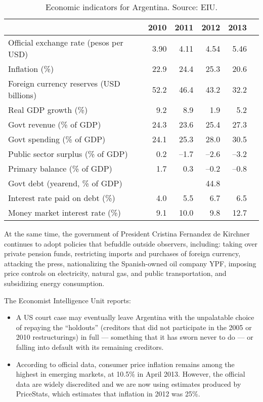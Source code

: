 \begin{enumerate}
\begin{table}[ht]
\centering
\tabcolsep=0.06in
\begin{tabular}{lrrrrr}
\toprule
                & 2010 & 2011 & 2012 & 2013 \\
\midrule
Official exchange rate (pesos per USD)  & 3.90 & 4.11 & 4.54 & 5.46  \\
Inflation (\%)              & 22.9 & 24.4 & 25.3 & 20.6 \\
Foreign currency reserves (USD billions) & 52.2 & 46.4 & 43.2 & 32.2 \\
Real GDP growth (\%)        & 9.2 & 8.9 & 1.9 & 5.2  \\
Govt revenue (\% of GDP)    & 24.3 & 23.6 & 25.4 & 27.3 \\
Govt spending (\% of GDP)   & 24.1 & 25.3 & 28.0 & 30.5  \\
Public sector surplus (\% of GDP) & 0.2 & --1.7 & --2.6 & --3.2 \\
Primary balance (\% of GDP) &  1.7 & 0.3 & --0.2 & --0.8   \\
Govt debt (yearend, \% of GDP)  & & & 44.8\\
Interest rate paid on debt (\%) & 4.0 & 5.5 & 6.7 & 6.5  \\
Money market interest rate (\%) & 9.1 & 10.0 & 9.8 & 12.7 \\
\bottomrule
\end{tabular}
\caption{Economic indicators for Argentina.  Source:  EIU.}
\label{tab:argentina}
\end{table}


At the same time, the government of President Cristina Fernandez de Kirchner
continues to adopt policies that befuddle outside observers, including:
taking over private pension funds,
restricting imports and purchases of foreign currency,
attacking the press,
nationalizing the Spanish-owned oil company YPF,
imposing price controls on electricity, natural gas, and public transportation,
and subsidizing energy consumption.

The Economist Intelligence Unit reports:
\begin{itemize}
\item A US court case may eventually leave
Argentina with the unpalatable choice of repaying the ``holdouts'' (creditors that
did not participate in the 2005 or 2010 restructurings) in full --- something that it
has sworn never to do --- or falling into default with its remaining creditors.

\item According to official data, consumer price inflation remains among the highest
in emerging markets, at 10.5\% in April 2013. However, the official data are
widely discredited and we are now using estimates produced by PriceStats,
which estimates that inflation in 2012 was 25\%.


\end{itemize}
\end{enumerate}
